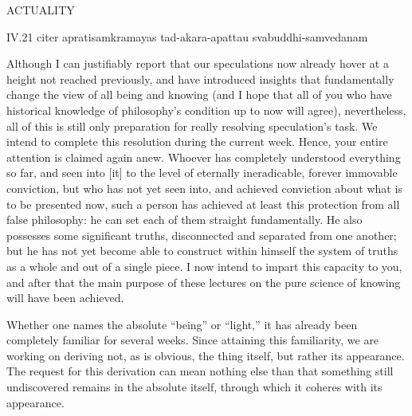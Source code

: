ACTUALITY

IV.21
citer apratisamkramayas tad-akara-apattau svabuddhi-samvedanam

Although I can justifiably report that
our speculations now already hover at
a height not reached previously,
and have introduced insights
that fundamentally change the view
of all being and knowing
(and I hope that all of you who have historical knowledge of
philosophy’s condition up to now will agree),
nevertheless, all of this is still only preparation
for really resolving speculation’s task.
We intend to complete this resolution during the current week.
Hence, your entire attention is claimed again anew.
Whoever has completely understood everything so far,
and seen into [it] to the level of
eternally ineradicable, forever immovable conviction,
but who has not yet seen into,
and achieved conviction about
what is to be presented now,
such a person has achieved at least
this protection from all false philosophy:
he can set each of them straight fundamentally.
He also possesses some significant truths,
disconnected and separated from one another;
but he has not yet become able to construct
within himself the system of truths
as a whole and out of a single piece.
I now intend to impart this capacity to you,
and after that the main purpose of these lectures
on the pure science of knowing will have been achieved.

Whether one names the absolute “being” or “light,”
it has already been completely familiar for several weeks.
Since attaining this familiarity, we are working on
deriving not, as is obvious, the thing itself,
but rather its appearance.
The request for this derivation can mean nothing else than
that something still undiscovered remains in the absolute itself,
through which it coheres with its appearance.

